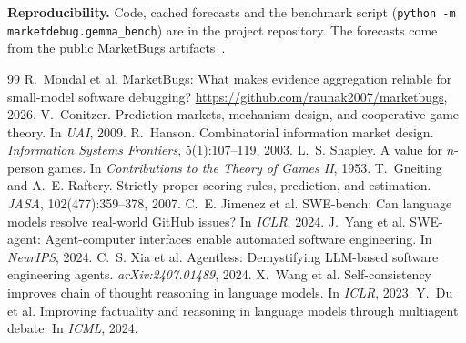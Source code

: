 \documentclass[10pt]{article}
\begin{document}
\textbf{Reproducibility.} Code, cached forecasts and the benchmark script (\texttt{python -m marketdebug.gemma\_bench}) are in the project repository. The forecasts come from the public MarketBugs artifacts~\cite{marketbugs}.

\small
\begin{thebibliography}{99}
 R.~Mondal et al. MarketBugs: What makes evidence aggregation reliable for small-model software debugging? \url{https://github.com/raunak2007/marketbugs}, 2026.
 V.~Conitzer. Prediction markets, mechanism design, and cooperative game theory. In \emph{UAI}, 2009.
 R.~Hanson. Combinatorial information market design. \emph{Information Systems Frontiers}, 5(1):107--119, 2003.
 L.~S. Shapley. A value for $n$-person games. In \emph{Contributions to the Theory of Games II}, 1953.
 T.~Gneiting and A.~E. Raftery. Strictly proper scoring rules, prediction, and estimation. \emph{JASA}, 102(477):359--378, 2007.
 C.~E. Jimenez et al. SWE-bench: Can language models resolve real-world GitHub issues? In \emph{ICLR}, 2024.
 J.~Yang et al. SWE-agent: Agent-computer interfaces enable automated software engineering. In \emph{NeurIPS}, 2024.
 C.~S. Xia et al. Agentless: Demystifying LLM-based software engineering agents. \emph{arXiv:2407.01489}, 2024.
 X.~Wang et al. Self-consistency improves chain of thought reasoning in language models. In \emph{ICLR}, 2023.
 Y.~Du et al. Improving factuality and reasoning in language models through multiagent debate. In \emph{ICML}, 2024.
\end{thebibliography}
\end{document}
